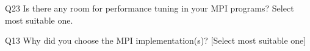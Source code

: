 \begin{description}%
\item{Q23} Is there any room for performance tuning in your MPI programs? Select most suitable one.%
\item{Q13} Why did you choose the MPI implementation(s)? [Select most suitable one]%
\end{description}%
